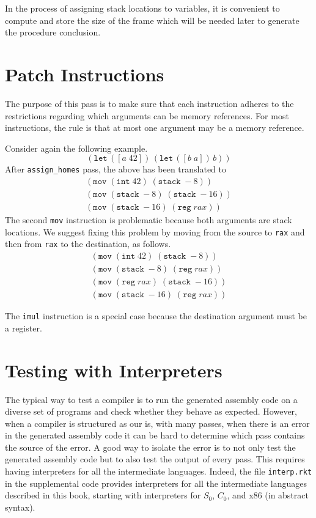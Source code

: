 \documentclass[12pt]{book}
\newcommand{\itm}[1]{\ensuremath{\mathit{#1}}}
\newcommand{\key}[1]{\texttt{#1}}
\newcommand{\LET}[3]{(\key{let}\,([#1\;#2])\,#3)}
\newcommand{\INT}[1]{(\key{int}\;#1)}
\newcommand{\REG}[1]{(\key{reg}\;#1)}
\newcommand{\STACKLOC}[1]{(\key{stack}\;#1)}
\begin{document}
In the process of assigning stack locations to variables, it is
convenient to compute and store the size of the frame which will be
needed later to generate the procedure conclusion.

\section{Patch Instructions}
\label{sec:patch-s0}

The purpose of this pass is to make sure that each instruction adheres
to the restrictions regarding which arguments can be memory
references. For most instructions, the rule is that at most one
argument may be a memory reference.

Consider again the following example.
\[
\LET{a}{42}{ \LET{b}{a}{ b }}
\]
After \key{assign\_homes} pass, the above has been translated to
\[
\begin{array}{l}
(\key{mov} \;\INT{42}\; \STACKLOC{{-}8})\\
(\key{mov}\;\STACKLOC{{-}8}\; \STACKLOC{{-}16})\\
(\key{mov}\;\STACKLOC{{-}16}\; \REG{\itm{rax}})
\end{array}
\]
The second \key{mov} instruction is problematic because both arguments
are stack locations. We suggest fixing this problem by moving from the
source to \key{rax} and then from \key{rax} to the destination, as
follows.
\[
\begin{array}{l}
(\key{mov} \;\INT{42}\; \STACKLOC{{-}8})\\
(\key{mov}\;\STACKLOC{{-}8}\; \REG{\itm{rax}})\\
(\key{mov}\;\REG{\itm{rax}}\; \STACKLOC{{-}16})\\
(\key{mov}\;\STACKLOC{{-}16}\; \REG{\itm{rax}})
\end{array}
\]

The \key{imul} instruction is a special case because the destination
argument must be a register.

\section{Testing with Interpreters}

The typical way to test a compiler is to run the generated assembly
code on a diverse set of programs and check whether they behave as
expected. However, when a compiler is structured as our is, with many
passes, when there is an error in the generated assembly code it can
be hard to determine which pass contains the source of the error.  A
good way to isolate the error is to not only test the generated
assembly code but to also test the output of every pass. This requires
having interpreters for all the intermediate languages.  Indeed, the
file \key{interp.rkt} in the supplemental code provides interpreters
for all the intermediate languages described in this book, starting
with interpreters for $S_0$, $C_0$, and x86 (in abstract syntax).
\end{document}
